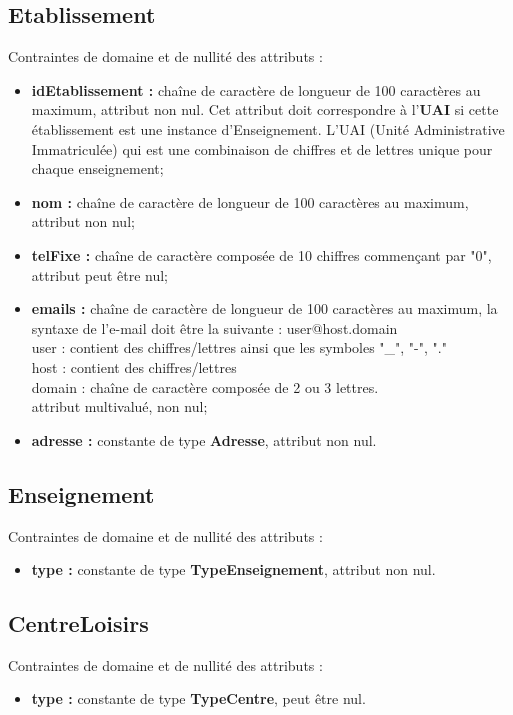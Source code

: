 \documentclass[asi, sansVersion]{picInsa}
\begin{document}
\subsection*{Etablissement}
Contraintes de domaine et de nullité des attributs :
\begin{itemize}
 	\item \textbf{idEtablissement :} chaîne de caractère de longueur de 100 caractères au maximum, attribut non nul. Cet attribut doit correspondre à l'\textbf{UAI} si cette établissement est une instance d'Enseignement. L'UAI (Unité Administrative Immatriculée) qui est une combinaison de chiffres et de lettres unique pour chaque enseignement;
	\item \textbf{nom :} chaîne de caractère de longueur de 100 caractères au maximum, attribut non nul;
	\item \textbf{telFixe :} chaîne de caractère composée de 10 chiffres commençant par "0", attribut peut être nul;
	\item \textbf{emails :} chaîne de caractère de longueur de 100 caractères au maximum, la syntaxe de l'e-mail doit être la suivante : user@host.domain\\
	user : contient des chiffres/lettres ainsi que les symboles "\_", "-", "." \\
	host : contient des chiffres/lettres \\
	domain : chaîne de caractère composée de 2 ou 3 lettres. \\
	attribut multivalué, non nul; 
	\item \textbf{adresse :} constante de type \textbf{Adresse}, attribut non nul.\\
\end{itemize}  

\subsection*{Enseignement}
Contraintes de domaine et de nullité des attributs :
\begin{itemize}
	\item \textbf{type :} constante de type \textbf{TypeEnseignement}, attribut non nul.\\
\end{itemize}

\subsection*{CentreLoisirs}
Contraintes de domaine et de nullité des attributs :
\begin{itemize}
	\item \textbf{type :} constante de type \textbf{TypeCentre}, peut être nul.\\
\end{itemize}
\end{document}
